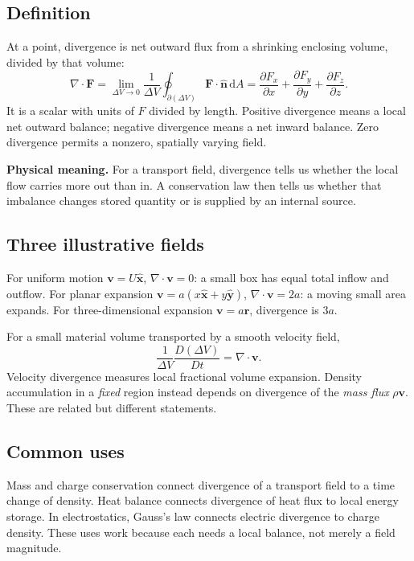\documentclass[11pt,letterpaper]{article}
\newcommand{\vect}[1]{\boldsymbol{#1}}
\newcommand{\dd}{\,\mathrm d}
\newcommand{\idea}[1]{\par\smallskip\noindent\colorbox{pale}{\parbox{\dimexpr\linewidth-2\fboxsep\relax}{\textbf{Physical meaning.} #1}}\par\smallskip}
\begin{document}
\subsection*{Definition}
At a point, divergence is net outward flux from a shrinking enclosing volume, divided by that volume:
\begin{equation}
\nabla\cdot\vect F
=\lim_{\Delta V\to0}\frac{1}{\Delta V}
\oint_{\partial(\Delta V)}\vect F\cdot\hat{\vect n}\dd A
=\frac{\partial F_x}{\partial x}+\frac{\partial F_y}{\partial y}+\frac{\partial F_z}{\partial z}.
\end{equation}
It is a scalar with units of $F$ divided by length. Positive divergence means a local net outward balance; negative divergence means a net inward balance. Zero divergence permits a nonzero, spatially varying field.

\idea{For a transport field, divergence tells us whether the local flow carries more out than in. A conservation law then tells us whether that imbalance changes stored quantity or is supplied by an internal source.}

\subsection*{Three illustrative fields}
For uniform motion $\vect v=U\hat{\vect x}$, $\nabla\cdot\vect v=0$: a small box has equal total inflow and outflow. For planar expansion $\vect v=a(x\hat{\vect x}+y\hat{\vect y})$, $\nabla\cdot\vect v=2a$: a moving small area expands. For three-dimensional expansion $\vect v=a\vect r$, divergence is $3a$.

For a small material volume transported by a smooth velocity field,
\[
\frac{1}{\Delta V}\frac{D(\Delta V)}{Dt}=\nabla\cdot\vect v.
\]
Velocity divergence measures local fractional volume expansion. Density accumulation in a \emph{fixed} region instead depends on divergence of the \emph{mass flux} $\rho\vect v$. These are related but different statements.

\subsection*{Common uses}
Mass and charge conservation connect divergence of a transport field to a time change of density. Heat balance connects divergence of heat flux to local energy storage. In electrostatics, Gauss's law connects electric divergence to charge density. These uses work because each needs a local balance, not merely a field magnitude.
\end{document}
